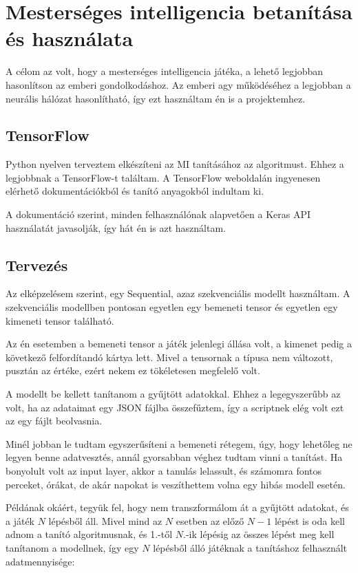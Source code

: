 \chapter{Mesterséges intelligencia betanítása és használata}
\thispagestyle{fancy}
\pagestyle{fancy}


A célom az volt, hogy a mesterséges intelligencia játéka, a lehető legjobban hasonlítson az emberi gondolkodáshoz. Az emberi agy működéséhez a legjobban 
a neurális hálózat hasonlítható, így ezt használtam én is a projektemhez. 



\section{TensorFlow}
Python nyelven terveztem elkészíteni az MI tanításához az algoritmust. Ehhez a legjobbnak a TensorFlow-t \cite{tensorflow2015-whitepaper} találtam.
A TensorFlow weboldalán ingyenesen elérhető dokumentációkból és tanító anyagokból indultam ki. 

A dokumentáció szerint, minden felhasználónak alapvetően a Keras API \cite{chollet2015keras} használatát javasolják, így hát én is azt használtam. 

\section{Tervezés}
Az elképzelésem szerint, egy Sequential, azaz szekvenciális modellt használtam. A szekvenciális modellben pontosan egyetlen egy bemeneti tensor és egyetlen egy kimeneti tensor található.

Az én esetemben a bemeneti tensor a játék jelenlegi állása volt, a kimenet pedig a következő felfordítandó kártya lett. Mivel a tensornak a típusa nem változott, pusztán az értéke, ezért nekem ez tökéletesen megfelelő volt.

A modellt be kellett tanítanom a gyűjtött adatokkal. Ehhez a legegyszerűbb az volt, ha az adataimat egy JSON fájlba összefűztem, így a scriptnek elég volt ezt az egy fájlt beolvasnia.

Minél jobban le tudtam egyszerűsíteni a bemeneti rétegem, úgy, hogy lehetőleg ne legyen benne adatvesztés, annál gyorsabban véghez tudtam vinni a tanítást. 
Ha bonyolult volt az input layer, akkor a tanulás lelassult, és számomra fontos perceket, órákat, de akár napokat is veszíthettem volna egy hibás modell esetén.

Példának okáért, tegyük fel, hogy nem transzformálom át a gyűjtött adatokat, és a játék $N$ lépésből áll. 
Mivel mind az $N$ esetben az előző $N-1$ lépést is oda kell adnom a tanító algoritmusnak, és 1.-től $N.$-ik lépésig az összes lépést meg kell tanítanom a modellnek, 
így egy $N$ lépésből álló játéknak a tanításhoz felhasznált adatmennyisége:

